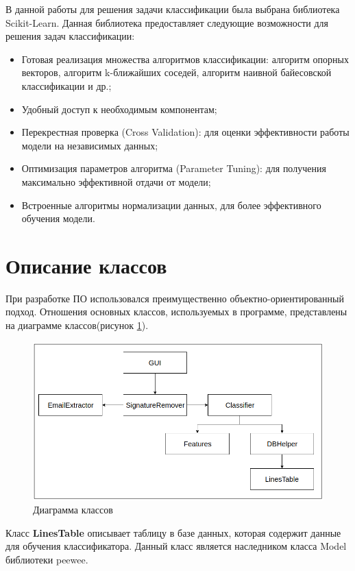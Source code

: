 В данной работы для решения задачи классификации была выбрана библиотека Scikit-Learn. Данная библиотека предоставляет следующие возможности для решения задач классификации:

\begin{itemize}
	\item Готовая реализация множества алгоритмов классификации: алгоритм опорных векторов, алгоритм k-ближайших соседей, алгоритм наивной байесовской классификации и др.;
	\item Удобный доступ к необходимым компонентам;
	\item Перекрестная проверка (Cross Validation): для оценки эффективности работы модели на независимых данных;
	\item Оптимизация параметров алгоритма (Parameter Tuning): для получения максимально эффективной отдачи от модели;
	\item Встроенные алгоритмы нормализации данных, для более эффективного обучения модели.
\end{itemize}

\newpage
\section{Описание классов}
При разработке ПО использовался преимущественно объектно-ориентированный подход. Отношения основных классов, используемых в программе, представлены на диаграмме классов(рисунок \ref{impl:diagramm}).

\begin{figure}[h!]
	\centering
	\includegraphics[width=\textwidth]{inc/img/diagramm.png}
	\caption{Диаграмма классов}
	\label{impl:diagramm}
\end{figure}


Класс \textbf{LinesTable} описывает таблицу в базе данных, которая содержит данные для обучения классификатора. Данный класс является наследником класса Model библиотеки peewee.

